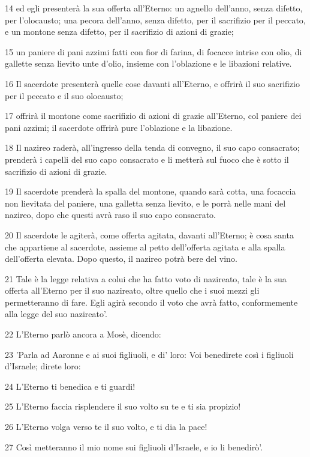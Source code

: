 \par 14 ed egli presenterà la sua offerta all'Eterno: un agnello dell'anno, senza difetto, per l'olocausto; una pecora dell'anno, senza difetto, per il sacrifizio per il peccato, e un montone senza difetto, per il sacrifizio di azioni di grazie;
\par 15 un paniere di pani azzimi fatti con fior di farina, di focacce intrise con olio, di gallette senza lievito unte d'olio, insieme con l'oblazione e le libazioni relative.
\par 16 Il sacerdote presenterà quelle cose davanti all'Eterno, e offrirà il suo sacrifizio per il peccato e il suo olocausto;
\par 17 offrirà il montone come sacrifizio di azioni di grazie all'Eterno, col paniere dei pani azzimi; il sacerdote offrirà pure l'oblazione e la libazione.
\par 18 Il nazireo raderà, all'ingresso della tenda di convegno, il suo capo consacrato; prenderà i capelli del suo capo consacrato e li metterà sul fuoco che è sotto il sacrifizio di azioni di grazie.
\par 19 Il sacerdote prenderà la spalla del montone, quando sarà cotta, una focaccia non lievitata del paniere, una galletta senza lievito, e le porrà nelle mani del nazireo, dopo che questi avrà raso il suo capo consacrato.
\par 20 Il sacerdote le agiterà, come offerta agitata, davanti all'Eterno; è cosa santa che appartiene al sacerdote, assieme al petto dell'offerta agitata e alla spalla dell'offerta elevata. Dopo questo, il nazireo potrà bere del vino.
\par 21 Tale è la legge relativa a colui che ha fatto voto di nazireato, tale è la sua offerta all'Eterno per il suo nazireato, oltre quello che i suoi mezzi gli permetteranno di fare. Egli agirà secondo il voto che avrà fatto, conformemente alla legge del suo nazireato'.
\par 22 L'Eterno parlò ancora a Mosè, dicendo:
\par 23 'Parla ad Aaronne e ai suoi figliuoli, e di' loro: Voi benedirete così i figliuoli d'Israele; direte loro:
\par 24 L'Eterno ti benedica e ti guardi!
\par 25 L'Eterno faccia risplendere il suo volto su te e ti sia propizio!
\par 26 L'Eterno volga verso te il suo volto, e ti dia la pace!
\par 27 Così metteranno il mio nome sui figliuoli d'Israele, e io li benedirò'.

